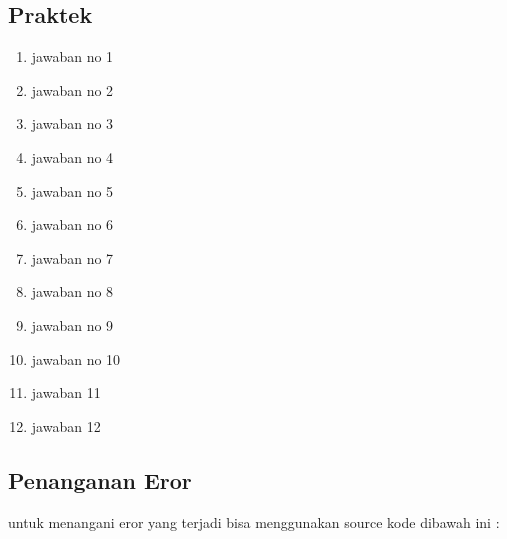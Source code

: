 \subsection{Praktek}
\begin{enumerate}
    \item jawaban no 1
 

    \item jawaban no 2
 

    \item jawaban no 3
 

    \item jawaban no 4
 

    \item jawaban no 5
 

    \item jawaban no 6
 

    \item jawaban no 7
 

    \item jawaban no 8
 

    \item jawaban no 9
 

    \item jawaban no 10
 

    \item jawaban 11
 

    \item jawaban 12
 
\end{enumerate}

\subsection{Penanganan Eror}
untuk menangani eror yang terjadi bisa menggunakan source kode dibawah ini :
 


